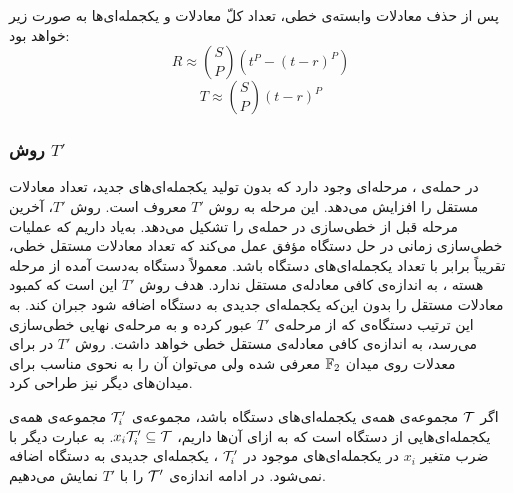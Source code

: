    پس از حذف معادلات وابسته‌ی خطی، تعداد کلّ معادلات و یکجمله‌ای‌ها به صورت زیر خواهد بود:
   $$R\approx \binom{S}{P}(t^{P}-(t-r)^{P})$$
   $$T\approx \binom{S}{P}(t-r)^{P}$$

 
\subsubsection*{روش 
	$T'$}
 در حمله‌ی 
، مرحله‌ای وجود دارد که بدون تولید یکجمله‌ای‌های جدید، تعداد معادلات مستقل را افزایش می‌دهد. این مرحله به 
روش 
$T'$
معروف است. روش 
$T'$،
آخرین مرحله قبل از خطی‌سازی در حمله‌ی 
را تشکیل می‌دهد. به‌یاد داریم که عملیات خطی‌سازی زمانی در حل دستگاه مؤفق عمل می‌کند که تعداد معادلات مستقل خطی، تقریباً برابر با تعداد یکجمله‌ای‌های دستگاه باشد. معمولاً دستگاه به‌دست  آمده از مرحله‌ هسته‌ 
، 
 به اندازه‌ی کافی معادله‌ی مستقل ندارد. هدف 
روش 
$T'$
این است که کمبود معادلات مستقل را بدون این‌که یکجمله‌ای جدیدی به دستگاه اضافه شود جبران کند. به این ترتیب دستگاه‌ی که از مرحله‌ی 
$T'$
عبور کرده و به مرحله‌ی نهایی خطی‌سازی می‌رسد، به اندازه‌ی کافی معادله‌ی مستقل خطی خواهد داشت. روش 
$T'$
در 
\cite{courtois2002cryptanalysis}
برای معدلات روی میدان 
$\mathbb{F}_{2}$
معرفی شده ولی می‌توان آن را به نحوی مناسب برای میدان‌های دیگر نیز طراحی کرد. 

\begin{definition}[\textbf{$\mT'_{i}$}]
اگر 
${\mathcal T}$
مجموعه‌ی  همه‌ی یکجمله‌ای‌های دستگاه باشد، مجموعه‌ی 
$\mT'_{i}$
مجموعه‌ی همه‌ی یکجمله‌ای‌هایی از دستگاه است که به ازای آن‌ها داریم، 
$x_{i}{\mathcal T}'_{i}\subseteq {\mathcal T}$.
به عبارت دیگر با ضرب متغیر 
$x_{i}$
در یکجمله‌ای‌های موجود در 
$\mT'_{i}$
، یکجمله‌ای جدیدی به دستگاه اضافه نمی‌شود. در ادامه  اندازه‌ی 
${\mathcal T}'$
را با 
$T'$
نمایش می‌دهیم. 
\end{definition}

